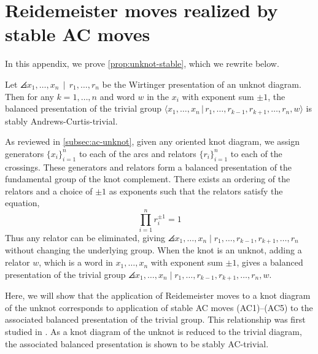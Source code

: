 \section{Reidemeister moves realized by stable AC moves}\label{app:reid}

In this appendix, we prove \cref{prop:unknot-stable}, which we rewrite below.

\begin{proposition}
    Let $\angles{ x_1,\ldots, x_n\, \mid \, r_1, \ldots, r_n }$ be the Wirtinger presentation of an unknot diagram. Then for any $k=1,\ldots,n$ and word $w$ in the $x_i$ with exponent sum $\pm 1$, the balanced presentation of the trivial group $\langle x_1,\ldots, x_n\,|\, r_1,\ldots, r_{k-1}, r_{k+1},\ldots, r_n, w\rangle$ is stably Andrews-Curtis-trivial.
\end{proposition}

As reviewed in \cref{subsec:ac-unknot}, given any oriented knot diagram, we assign generators $\{x_i\}_{i=1}^n$ to each of the arcs and relators $\{ r_i\}_{i=1}^n$ to each of the crossings. These generators and relators form a balanced presentation of the fundamental group of the knot complement. There exists an ordering of the relators and a choice of $\pm 1$ as exponents such that the relators satisfy the equation, 
\[
\prod\limits_{i=1}^n r_i^{\pm 1} = 1
\]
Thus any relator can be eliminated, giving $\angles{x_1, \dots , x_n \mid r_1, \dots, r_{k-1}, r_{k+1}, \dots, r_n }$ without changing the underlying group. When the knot is an unknot, adding a relator $w$, which is a word in $x_1, \dots , x_n$ with exponent sum $\pm 1$, gives a balanced presentation of the trivial group $\angles{x_1, \dots , x_n \mid r_1, \dots, r_{k-1}, r_{k+1}, \dots, r_n , w}$. 

Here, we will show that the application of Reidemeister moves to a knot diagram of the unknot corresponds to application of stable AC moves (AC1)--(AC5) to the associated balanced presentation of the trivial group. This relationship was first studied in \cite{WADA1994241}.
As a knot diagram of the unknot is reduced to the trivial diagram, the associated balanced presentation is shown to be stably AC-trivial.

